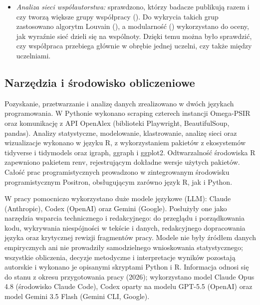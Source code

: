 \documentclass[
  polish,
  12pt,
  a4paper,
]{article}
\begin{document}
\begin{itemize}
{  i Lee 2017}). Zbudowano dwa modele o rozłącznych celach:
  \textbf{ilościowy} (wysoki sumaryczny wpływ, kumulatywny) oraz
  \textbf{jakościowy} (wysoka intensywność cytowań niezależna od
  dorobku: FWCI \textgreater{} 1, czyli powyżej światowej średniej w
  dziedzinie). W modelu jakościowym dołączono jawnie cechę \textbf{wieku
  akademickiego} (lata od pierwszej publikacji wg OpenAlex), by
  sprawdzić, czy jakość daje się sprowadzić do stażu.
\item
  \emph{Analiza sieci współautorstwa:} sprawdzono, którzy badacze
  publikują razem i czy tworzą większe grupy współpracy
  ().
  Do wykrycia takich grup zastosowano algorytm Louvain
  (), a modularność
  () wykorzystano do oceny, jak
  wyraźnie sieć dzieli się na wspólnoty. Dzięki temu można było
  sprawdzić, czy współpraca przebiega głównie w obrębie jednej uczelni,
  czy także między uczelniami.
\end{itemize}

\subsection{Narzędzia i środowisko
obliczeniowe}\label{narzux119dzia-i-ux15brodowisko-obliczeniowe}

Pozyskanie, przetwarzanie i analizę danych zrealizowano w dwóch językach
programowania. W Pythonie wykonano scraping czterech instancji
Omega-PSIR oraz komunikację z API OpenAlex (biblioteki Playwright,
BeautifulSoup, pandas). Analizy statystyczne, modelowanie, klastrowanie,
analizę sieci oraz wizualizacje wykonano w języku R, z wykorzystaniem
pakietów z ekosystemów tidyverse i tidymodels oraz igraph, ggraph i
ggplot2. Odtwarzalność środowiska R zapewniono pakietem renv,
rejestrującym dokładne wersje użytych pakietów. Całość prac
programistycznych prowadzono w zintegrowanym środowisku programistycznym
Positron, obsługującym zarówno język R, jak i Python.

W pracy pomocniczo wykorzystano duże modele językowe (LLM): Claude
(Anthropic), Codex (OpenAI) oraz Gemini (Google). Posłużyły one jako
narzędzia wsparcia technicznego i redakcyjnego: do przeglądu i
porządkowania kodu, wykrywania niespójności w tekście i danych,
redakcyjnego dopracowania języka oraz krytycznej rewizji fragmentów
pracy. Modele nie były źródłem danych empirycznych ani nie prowadziły
samodzielnego wnioskowania statystycznego; wszystkie obliczenia, decyzje
metodyczne i interpretacje wyników pozostają autorskie i wykonano je
opisanymi skryptami Python i R. Informacja odnosi się do stanu z okresu
przygotowania pracy (2026); wykorzystano model Claude Opus 4.8
(środowisko Claude Code), Codex oparty na modelu GPT-5.5 (OpenAI) oraz
model Gemini 3.5 Flash (Gemini CLI, Google).
\end{document}
